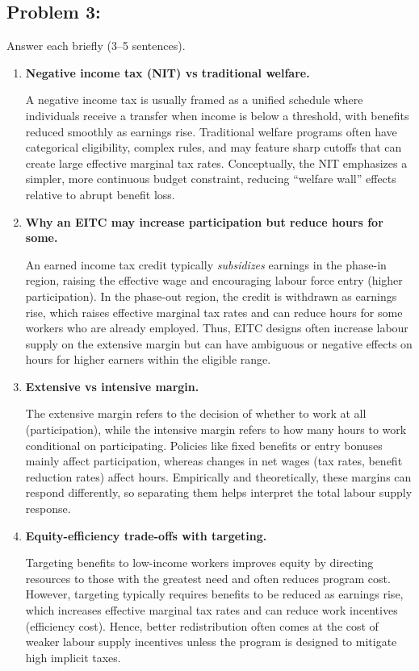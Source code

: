 \documentclass[12pt]{article}
\begin{document}
\subsection*{Problem 3: }

Answer each briefly (3--5 sentences).

\begin{enumerate}
\item \textbf{Negative income tax (NIT) vs traditional welfare.}

A negative income tax is usually framed as a unified schedule where individuals receive a transfer when income is below a threshold, with benefits reduced smoothly as earnings rise.
Traditional welfare programs often have categorical eligibility, complex rules, and may feature sharp cutoffs that can create large effective marginal tax rates.
Conceptually, the NIT emphasizes a simpler, more continuous budget constraint, reducing ``welfare wall'' effects relative to abrupt benefit loss.

\item \textbf{Why an EITC may increase participation but reduce hours for some.}

An earned income tax credit typically \emph{subsidizes} earnings in the phase-in region, raising the effective wage and encouraging labour force entry (higher participation).
In the phase-out region, the credit is withdrawn as earnings rise, which raises effective marginal tax rates and can reduce hours for some workers who are already employed.
Thus, EITC designs often increase labour supply on the extensive margin but can have ambiguous or negative effects on hours for higher earners within the eligible range.

\item \textbf{Extensive vs intensive margin.}

The extensive margin refers to the decision of whether to work at all (participation), while the intensive margin refers to how many hours to work conditional on participating.
Policies like fixed benefits or entry bonuses mainly affect participation, whereas changes in net wages (tax rates, benefit reduction rates) affect hours.
Empirically and theoretically, these margins can respond differently, so separating them helps interpret the total labour supply response.

\item \textbf{Equity-efficiency trade-offs with targeting.}

Targeting benefits to low-income workers improves equity by directing resources to those with the greatest need and often reduces program cost.
However, targeting typically requires benefits to be reduced as earnings rise, which increases effective marginal tax rates and can reduce work incentives (efficiency cost).
Hence, better redistribution often comes at the cost of weaker labour supply incentives unless the program is designed to mitigate high implicit taxes.
\end{enumerate}
\end{document}
